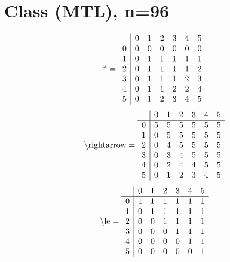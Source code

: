 \documentclass[11pt]{article}
\begin{document}
\section{Class (MTL), n=96}
\[\text{*} = 
\begin{array}{r | r r r r r r}
 & 0 & 1 & 2 & 3 & 4 & 5 \\ \hline
0 & 0 & 0 & 0 & 0 & 0 & 0 \\
1 & 0 & 1 & 1 & 1 & 1 & 1 \\
2 & 0 & 1 & 1 & 1 & 1 & 2 \\
3 & 0 & 1 & 1 & 1 & 2 & 3 \\
4 & 0 & 1 & 1 & 2 & 2 & 4 \\
5 & 0 & 1 & 2 & 3 & 4 & 5 \\
\end{array}
\]
\[\text{\textbackslash rightarrow} = 
\begin{array}{r | r r r r r r}
 & 0 & 1 & 2 & 3 & 4 & 5 \\ \hline
0 & 5 & 5 & 5 & 5 & 5 & 5 \\
1 & 0 & 5 & 5 & 5 & 5 & 5 \\
2 & 0 & 4 & 5 & 5 & 5 & 5 \\
3 & 0 & 3 & 4 & 5 & 5 & 5 \\
4 & 0 & 2 & 4 & 4 & 5 & 5 \\
5 & 0 & 1 & 2 & 3 & 4 & 5 \\
\end{array}
\]
\[\text{\textbackslash le} = 
\begin{array}{r | r r r r r r}
 & 0 & 1 & 2 & 3 & 4 & 5 \\ \hline
0 & 1 & 1 & 1 & 1 & 1 & 1 \\
1 & 0 & 1 & 1 & 1 & 1 & 1 \\
2 & 0 & 0 & 1 & 1 & 1 & 1 \\
3 & 0 & 0 & 0 & 1 & 1 & 1 \\
4 & 0 & 0 & 0 & 0 & 1 & 1 \\
5 & 0 & 0 & 0 & 0 & 0 & 1 \\
\end{array}
\]
\end{document}
